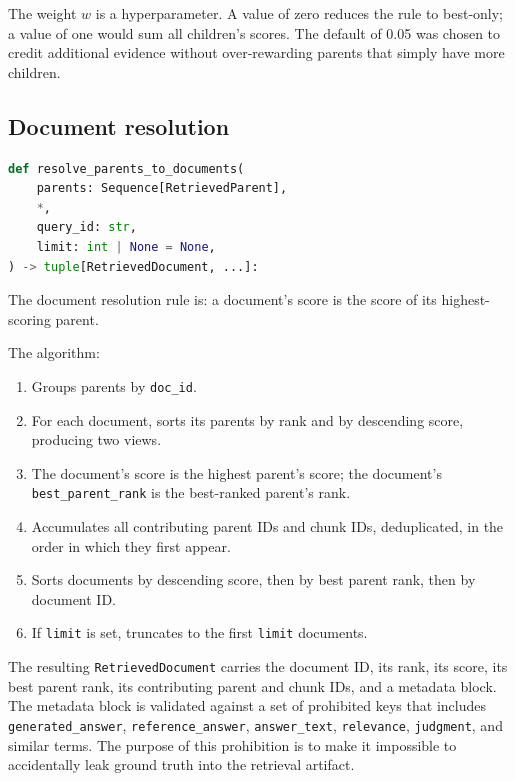\documentclass[11pt,a4paper]{article}
\begin{document}
The weight $w$ is a hyperparameter. A value of zero reduces the rule
to best-only; a value of one would sum all children's scores. The
default of \num{0.05} was chosen to credit additional evidence
without over-rewarding parents that simply have more children.

\subsection{Document resolution}
\begin{lstlisting}[language=python]
def resolve_parents_to_documents(
    parents: Sequence[RetrievedParent],
    *,
    query_id: str,
    limit: int | None = None,
) -> tuple[RetrievedDocument, ...]:
\end{lstlisting}

The document resolution rule is: a document's score is the score of
its highest-scoring parent.

The algorithm:

\begin{enumerate}[leftmargin=1.5em,itemsep=0.15em]
  \item Groups parents by \texttt{doc\_id}.
  \item For each document, sorts its parents by rank and by descending
    score, producing two views.
  \item The document's score is the highest parent's score; the
    document's \texttt{best\_parent\_rank} is the best-ranked parent's
    rank.
  \item Accumulates all contributing parent IDs and chunk IDs,
    deduplicated, in the order in which they first appear.
  \item Sorts documents by descending score, then by best parent
    rank, then by document ID.
  \item If \texttt{limit} is set, truncates to the first \texttt{limit}
    documents.
\end{enumerate}

The resulting \texttt{RetrievedDocument} carries the document ID, its
rank, its score, its best parent rank, its contributing parent and
chunk IDs, and a metadata block. The metadata block is validated
against a set of prohibited keys that includes \texttt{generated\_answer},
\texttt{reference\_answer}, \texttt{answer\_text}, \texttt{relevance},
\texttt{judgment}, and similar terms. The purpose of this prohibition
is to make it impossible to accidentally leak ground truth into the
retrieval artifact.
\end{document}
